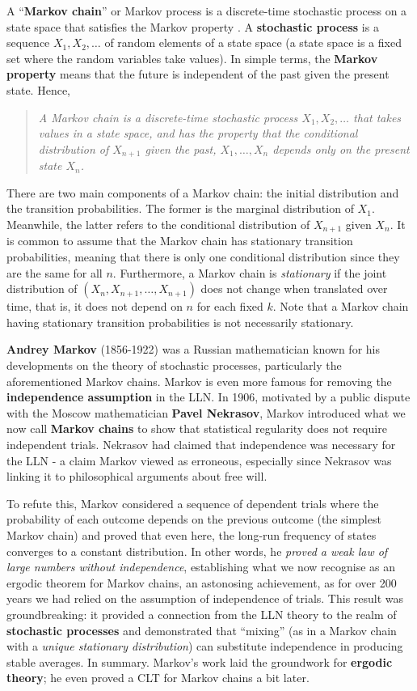 A ``\textbf{Markov chain}'' or Markov process is a discrete-time stochastic process on a state space that satisfies the Markov property \citep{geyer1998markov}.
A \textbf{stochastic process} is a sequence $X_1,X_2,\ldots$ of random elements of a state space (a state space is a fixed set where the random variables take values). In simple terms, the \textbf{Markov property} means that the future is independent of the past given the present state. 
Hence, 
\begin{quote}
    \textit{A Markov chain is a discrete-time stochastic process $X_1,X_2,\ldots$ that takes values in a state space, and has the property that the conditional distribution of $X_{n+1}$ given the past, $X_1,\ldots,X_n$ depends only on the present state $X_n$.}
\end{quote}

There are two main components of a Markov chain: the initial distribution and the transition probabilities. The former is the marginal distribution of $X_1$. Meanwhile, the latter refers to the conditional distribution of $X_{n+1}$ given $X_n$. It is common to assume that the Markov chain has stationary transition probabilities, meaning that there is only one conditional distribution since they are the same for all $n$. Furthermore, a Markov chain is \textit{stationary} if the joint distribution of $(X_n,X_{n+1},\ldots,X_{n+1})$ does not change when translated over time, that is, it does not depend on $n$ for each fixed $k$. Note that a Markov chain having stationary transition probabilities is not necessarily stationary.

\textbf{Andrey Markov} (1856-1922) was a Russian mathematician known for his developments on the theory of stochastic processes, particularly the aforementioned Markov chains. 
Markov is even more famous for removing the \textbf{independence assumption} in the LLN. In 1906, motivated by a public dispute with the Moscow mathematician \textbf{Pavel Nekrasov}, Markov introduced what we now call \textbf{Markov chains} to show that statistical regularity does not require independent trials. Nekrasov had claimed that independence was necessary for the LLN - a claim Markov viewed as erroneous, especially since Nekrasov was linking it to philosophical arguments about free will. 

To refute this, Markov considered a sequence of dependent trials where the probability of each outcome depends on the previous outcome (the simplest Markov chain) and proved that even here, the long-run frequency of states converges to a constant distribution. In other words, he \textit{proved a weak law of large numbers without independence}, establishing what we now recognise as an ergodic theorem for Markov chains, an astonosing achievement, as for over 200 years we had relied on the assumption of independence of trials. This result was groundbreaking: it provided a connection from the LLN theory to the realm of \textbf{stochastic processes} and demonstrated that ``mixing'' (as in a Markov chain with a \textit{unique stationary distribution}) can substitute independence in producing stable averages. In summary. Markov’s work laid the groundwork for \textbf{ergodic theory}; he even proved a CLT for Markov chains a bit later.

